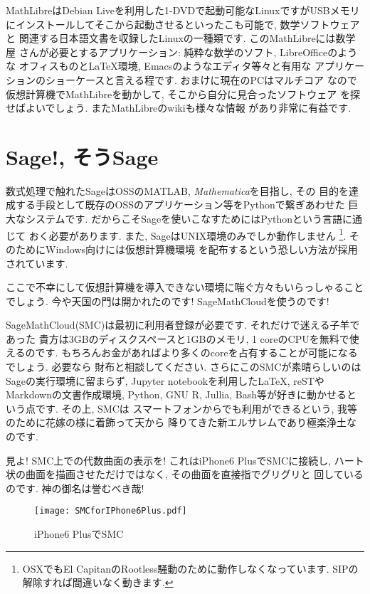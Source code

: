 \documentclass[b5j,8pt,twocolumn]{ltjsarticle}
\begin{document}
MathLibreはDebian Liveを利用した1-DVDで起動可能なLinuxですがUSBメモリ
にインストールしてそこから起動させるといったこも可能で, 数学ソフトウェアと
関連する日本語文書を収録したLinuxの一種類です. このMathLibreには数学屋
さんが必要とするアプリケーション: 純粋な数学のソフト, LibreOfficeのような
オフィスものと{\LaTeX}環境,  Emacsのようなエディタ等々と有用な
アプリケーションのショーケースと言える程です. おまけに現在のPCはマルチコア
なので仮想計算機でMathLibreを動かして, そこから自分に見合ったソフトウェア
を探せばよいでしょう. またMathLibre\cite{MathLibre}のwikiも様々な情報
があり非常に有益です.


\section{Sage!, そうSage}

数式処理で触れたSageはOSSのMATLAB, \textit{Mathematica}を目指し, その
目的を達成する手段として既存のOSSのアプリケーション等をPythonで繋ぎあわせた
巨大なシステムです. だからこそSageを使いこなすためにはPythonという言語に通じて
おく必要があります. また, SageはUNIX環境のみでしか動作しません
\footnote{OSXでもEl CapitanのRootless騒動のために動作しなくなっています.
 SIPの解除すれば間違いなく動きます.}. そのためにWindows向けには仮想計算機環境
を配布するという恐しい方法が採用されています.
\newline

ここで不幸にして仮想計算機を導入できない環境に喘ぐ方々もいらっしゃることでしょう.
 今や天国の門は開かれたのです! SageMathCloudを使うのです!
\newline

SageMathCloud(SMC)は最初に利用者登録が必要です. それだけで迷える子羊であった
貴方は3GBのディスクスペースと1GBのメモリ, 1 coreのCPUを無料で使えるのです.
 もちろんお金があればより多くのcoreを占有することが可能になるでしょう. 必要なら
財布と相談してください. さらにこのSMCが素晴らしいのはSageの実行環境に留まらず,
 Jupyter notebookを利用した{\LaTeX}, reSTやMarkdownの文書作成環境,
 Python, GNU R, Jullia, Bash等が好きに動かせるという点です. その上, SMCは
スマートフォンからでも利用ができるという, 我等のために花嫁の様に着飾って天から
降りてきた新エルサレムであり極楽浄土なのです. 
\newline

見よ! SMC上での代数曲面の表示を! これはiPhone6 PlusでSMCに接続し,
ハート状の曲面を描画させただけではなく, その曲面を直接指でグリグリと
回しているのです. 神の御名は誉むべき哉!

\begin{figure}[htbp]
\begin{center}
\texttt{[image: SMCforIPhone6Plus.pdf]}
\caption{iPhone6 PlusでSMC}
\label{fig:smc4iphone}
\end{center}
\end{figure}
\end{document}

